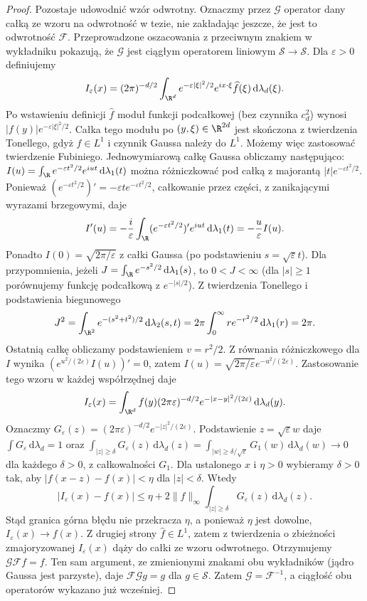 \begin{proof}
Pozostaje udowodnić wzór odwrotny. Oznaczmy przez
$\mathcal G$ operator dany całką ze wzoru na odwrotność
w tezie, nie zakładając jeszcze, że jest to odwrotność
$\mathcal F$. Przeprowadzone oszacowania z przeciwnym
znakiem w wykładniku pokazują, że $\mathcal G$ jest
ciągłym operatorem liniowym $\mathcal S\to\mathcal S$.
Dla $\varepsilon>0$ definiujemy
\[
I_\varepsilon(x)=(2\pi)^{-d/2}\int_{\R^d}
 e^{-\varepsilon|\xi|^2/2}e^{ix\cdot\xi}
 \widehat f(\xi)\,\mathrm d\lambda_d(\xi).
\]
Po wstawieniu definicji $\widehat f$ moduł funkcji
podcałkowej (bez czynnika $c_d^2$) wynosi
$|f(y)|e^{-\varepsilon|\xi|^2/2}$. Całka tego modułu
po $(y,\xi)\in\R^{2d}$ jest skończona z twierdzenia
Tonellego, gdyż $f\in L^1$ i czynnik Gaussa należy do
$L^1$. Możemy więc zastosować twierdzenie Fubiniego.
Jednowymiarową całkę Gaussa obliczamy następująco:
$I(u)=\int_\R e^{-\varepsilon t^2/2}e^{iut}\,\mathrm d\lambda_1(t)$
można różniczkować pod całką z majorantą
$|t|e^{-\varepsilon t^2/2}$. Ponieważ
$(e^{-\varepsilon t^2/2})'=-\varepsilon t e^{-\varepsilon t^2/2}$,
całkowanie przez części, z zanikającymi wyrazami brzegowymi, daje
\[
I'(u)=-\frac{i}{\varepsilon}
\int_\R (e^{-\varepsilon t^2/2})'e^{iut}\,\mathrm d\lambda_1(t)
=-\frac u\varepsilon I(u).
\]
Ponadto $I(0)=\sqrt{2\pi/\varepsilon}$ z całki Gaussa
(po podstawieniu $s=\sqrt\varepsilon t$).
Dla przypomnienia, jeżeli
$J=\int_\R e^{-s^2/2}\,\mathrm d\lambda_1(s)$,
to $0<J<\infty$ (dla $|s|\ge1$ porównujemy funkcję
podcałkową z $e^{-|s|/2}$).
Z twierdzenia Tonellego i podstawienia biegunowego
\[
 J^2=\int_{\R^2} e^{-(s^2+t^2)/2}\,\mathrm d\lambda_2(s,t)
 =2\pi\int_0^\infty re^{-r^2/2}\,\mathrm d\lambda_1(r)
 =2\pi.
\]
Ostatnią całkę obliczamy podstawieniem $v=r^2/2$.
Z równania różniczkowego dla $I$ wynika
$(e^{u^2/(2\varepsilon)}I(u))'=0$, zatem
$I(u)=\sqrt{2\pi/\varepsilon}e^{-u^2/(2\varepsilon)}$.
Zastosowanie tego wzoru w każdej współrzędnej daje
\[
I_\varepsilon(x)=\int_{\R^d}f(y)
(2\pi\varepsilon)^{-d/2}e^{-|x-y|^2/(2\varepsilon)}
\,\mathrm d\lambda_d(y).
\]
Oznaczmy $G_\varepsilon(z)=(2\pi\varepsilon)^{-d/2}
e^{-|z|^2/(2\varepsilon)}$. Podstawienie $z=\sqrt\varepsilon w$
daje $\int G_\varepsilon\,\mathrm d\lambda_d=1$ oraz
$\int_{|z|\ge\delta}G_\varepsilon(z)\,\mathrm d\lambda_d(z)
=\int_{|w|\ge\delta/\sqrt\varepsilon}G_1(w)\,\mathrm d\lambda_d(w)
\to0$ dla każdego $\delta>0$, z całkowalności $G_1$.
Dla ustalonego $x$ i $\eta>0$ wybieramy $\delta>0$ tak,
aby $|f(x-z)-f(x)|<\eta$ dla $|z|<\delta$.
Wtedy
\[
|I_\varepsilon(x)-f(x)|\le
\eta+2\|f\|_\infty
\int_{|z|\ge\delta}G_\varepsilon(z)\,\mathrm d\lambda_d(z).
\]
Stąd granica górna błędu nie przekracza $\eta$, a ponieważ
$\eta$ jest dowolne, $I_\varepsilon(x)\to f(x)$.
Z drugiej strony $\widehat f\in L^1$, zatem
z twierdzenia o zbieżności zmajoryzowanej
$I_\varepsilon(x)$ dąży do całki ze wzoru odwrotnego.
Otrzymujemy $\mathcal G\mathcal Ff=f$.
Ten sam argument, ze zmienionymi znakami obu
wykładników (jądro Gaussa jest parzyste), daje
$\mathcal F\mathcal Gg=g$ dla $g\in\mathcal S$.
Zatem $\mathcal G=\mathcal F^{-1}$, a ciągłość obu
operatorów wykazano już wcześniej.
\end{proof}

